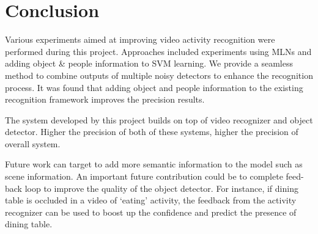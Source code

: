 \chapter{Conclusion}

\label{ch6_CONCLUSION}

Various experiments aimed at improving video activity recognition were performed during this project.
Approaches included experiments using MLNs and adding object \& people information to SVM learning.
We provide a seamless method to combine outputs of multiple noisy detectors to enhance the recognition
process. It was found that adding object and people information to the existing recognition framework
improves the precision results.


The system developed by this project builds on top of video recognizer and object detector.
Higher the precision of both of these systems, higher the precision of overall system.

Future work can target to add more semantic information to the model such as scene information.
An important future contribution could be to complete feed-back loop to improve the quality
of the object detector. 
For instance, if dining table is occluded in a video of `eating' activity, the feedback from 
the activity recognizer can be used to boost up the confidence and predict the presence of dining table.

\begin{comment}
For instance, if dining table is occluded in `eating' activity,
the feedback information from MLN can be used to increase the confidence of the presence of
object dining table.
\end{comment}

